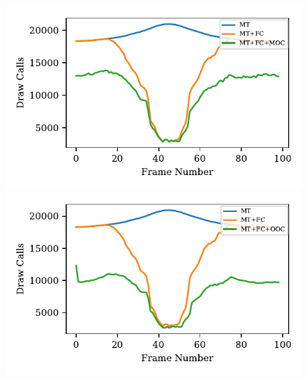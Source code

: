 \documentclass[journal]{vgtc}
\begin{document}
\begin{figure}
	\begin{minipage}{0.5\textwidth}
		\includegraphics[width=\textwidth]{images/Evaluation_7_Results_MOC_Draw Calls.pdf}
	\end{minipage}
	\begin{minipage}{0.5\textwidth}
		\includegraphics[width=\textwidth]{images/Evaluation_7_Results_OGL_Draw Calls.pdf}
	\end{minipage}
	\begin{minipage}{\textwidth}
		\centering
\end{minipage}
\end{figure}
\end{document}
